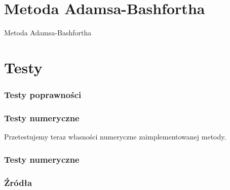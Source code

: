 \documentclass[9pt]{beamer}
\begin{document}
\section{Metoda Adamsa-Bashfortha}
\begin{frame}{Metoda Adamsa-Bashfortha}
    
\end{frame}

\section{Testy}
\begin{frame}
	\frametitle{Testy poprawności}
\end{frame}


\begin{frame}
	\frametitle{Testy numeryczne}
	\begin{spacing}{1.25}
		Przetestujemy teraz własności numeryczne zaimplementowanej metody. 
	\end{spacing}
\end{frame}



\begin{frame}
	\frametitle{Testy numeryczne}
\end{frame}


\begin{frame}
	\frametitle{Źródła}
    \nocite{*}
    \printbibliography
\end{frame}
\end{document}
